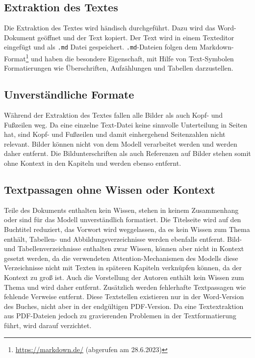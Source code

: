 \subsection{Extraktion des Textes}
Die Extraktion des Textes wird händisch durchgeführt.
Dazu wird das Word-Dokument geöffnet und der Text kopiert.
Der Text wird in einem Texteditor eingefügt und als \texttt{.md} Datei gespeichert.
\texttt{.md}-Dateien folgen dem Markdown-Format\footnote{\url{https://markdown.de/} (abgerufen am 28.6.2023)} und haben die besondere Eigenschaft, mit Hilfe von Text-Symbolen Formatierungen wie Überschriften, Aufzählungen und Tabellen darzustellen.

\subsection{Unverständliche Formate}
Während der Extraktion des Textes fallen alle Bilder als auch Kopf- und Fußzeilen weg.
Da eine einzelne Text-Datei keine sinnvolle Unterteilung in Seiten hat, sind Kopf- und Fußzeilen und damit einhergehend Seitenzahlen nicht relevant.
Bilder können nicht von dem Modell verarbeitet werden und werden daher entfernt.
Die Bildunterschriften als auch Referenzen auf Bilder stehen somit ohne Kontext in den Kapiteln und werden ebenso entfernt.

\subsection{Textpassagen ohne Wissen oder Kontext}
Teile des Dokuments enthalten kein Wissen, stehen in keinem Zusammenhang oder sind für das Modell unverständlich formatiert.
Die Titelseite wird auf den Buchtitel reduziert, das Vorwort wird weggelassen, da es kein Wissen zum Thema enthält, Tabellen- und Abbildungsverzeichnisse werden ebenfalls entfernt.
Bild- und Tabellenverzeichnisse enthalten zwar Wissen, können aber nicht in Kontext gesetzt werden, da die verwendeten Attention-Mechanismen des Modells diese Verzeichnisse nicht mit Texten in späteren Kapiteln verknüpfen können, da der Kontext zu groß ist.
Auch die Vorstellung der Autoren enthält kein Wissen zum Thema und wird daher entfernt.
Zusätzlich werden fehlerhafte Textpassagen wie fehlende Verweise entfernt.
Diese Textstellen existieren nur in der Word-Version des Buches, nicht aber in der endgültigen PDF-Version.
Da eine Textextraktion aus PDF-Dateien jedoch zu gravierenden Problemen in der Textformatierung führt, wird darauf verzichtet.

